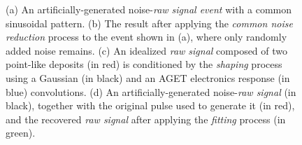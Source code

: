 \begin{figure}[htb!]
  \centering
	\caption{(a) An artificially-generated noise-\emph{raw signal event} with a common sinusoidal pattern. (b) The result after applying the \emph{common noise reduction} process to the event shown in (a), where only randomly added noise remains. (c) An idealized \emph{raw signal} composed of two point-like deposits (in red) is conditioned by the \emph{shaping} process using a Gaussian (in black) and an AGET electronics response (in blue) convolutions. (d) An artificially-generated noise-\emph{raw signal} (in black), together with the original pulse used to generate it (in red), and the recovered \emph{raw signal} after applying the \emph{fitting} process (in green).}\label{fig:rawlib}
\end{figure}

